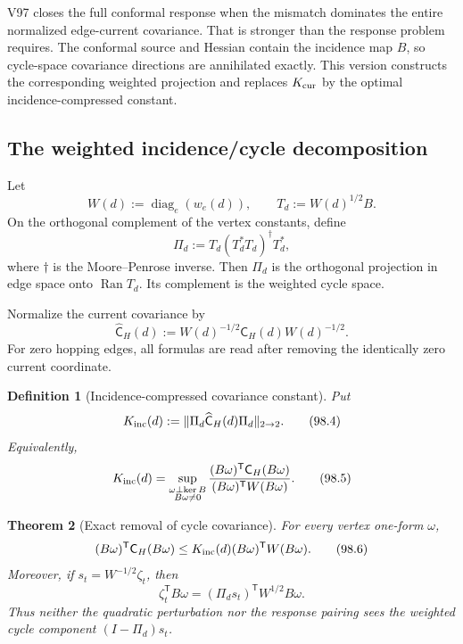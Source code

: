 \documentclass[11pt]{article}
\newtheorem{theorem}{Theorem}[section]
\newtheorem{definition}[theorem]{Definition}
\theoremstyle{remark}
\begin{document}
V97 closes the full conformal response when the mismatch dominates the
entire normalized edge-current covariance.  That is stronger than the
response problem requires.  The conformal source and Hessian contain
the incidence map \(B\), so cycle-space covariance directions are
annihilated exactly.  This version constructs the corresponding
weighted projection and replaces \(K_{\rm cur}\) by the optimal
incidence-compressed constant.

\subsection{The weighted incidence/cycle decomposition}

Let
\[
 W(d):=\operatorname{diag}_e(w_e(d)),
 \qquad
 T_d:=W(d)^{1/2}B.                                  \tag{98.1}
\]
On the orthogonal complement of the vertex constants, define
\[
 \Pi_d:=T_d(T_d^*T_d)^\dagger T_d^*,                \tag{98.2}
\]
where \(\dagger\) is the Moore--Penrose inverse.  Then \(\Pi_d\) is
the orthogonal projection in edge space onto
\(\operatorname{Ran}T_d\).  Its complement is the weighted cycle
space.

Normalize the current covariance by
\[
 \widehat{\mathsf C}_H(d)
 :=W(d)^{-1/2}\mathsf C_H(d)W(d)^{-1/2}.             \tag{98.3}
\]
For zero hopping edges, all formulas are read after removing the
identically zero current coordinate.

\begin{definition}[Incidence-compressed covariance constant]
\label{def:v17v98-kinc}
Put
\[
 K_{\rm inc}(d)
 :=\|\Pi_d\widehat{\mathsf C}_H(d)\Pi_d\|_{2\to2}.  \tag{98.4}
\]
Equivalently,
\[
 K_{\rm inc}(d)
 =\sup_{\substack{\omega\perp\ker B\\B\omega\ne0}}
 \frac{(B\omega)^{\mathsf T}\mathsf C_H(B\omega)}
      {(B\omega)^{\mathsf T}W(B\omega)}.            \tag{98.5}
\]
\end{definition}

\begin{theorem}[Exact removal of cycle covariance]
\label{thm:v17v98-cycle-removal}
For every vertex one-form \(\omega\),
\[
 (B\omega)^{\mathsf T}\mathsf C_H(B\omega)
 \leq K_{\rm inc}(d)
       (B\omega)^{\mathsf T}W(B\omega).             \tag{98.6}
\]
Moreover, if \(s_t=W^{-1/2}\zeta_t\), then
\[
 \zeta_t^{\mathsf T}B\omega
 =(\Pi_ds_t)^{\mathsf T}W^{1/2}B\omega.             \tag{98.7}
\]
Thus neither the quadratic perturbation nor the response pairing sees
the weighted cycle component \((I-\Pi_d)s_t\).
\end{theorem}
\end{document}
